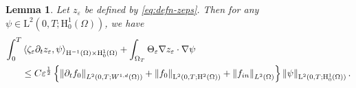 \documentclass[10pt,a4paper]{amsart}
\newtheorem{lemma}{Lemma}
\newcommand{\eps}{\varepsilon}
\begin{document}
\begin{lemma}\label{lem:bound-weak-form-2}
Let $z_\eps$ be defined by \eqref{eq:defn-zeps}. Then for any $\psi \in \mathrm{L}^2(0,T;\mathrm H_0^1(\Omega))$, we have
\begin{equation*}
\begin{aligned}
\int_0^T & \left\langle \zeta_\eps\partial_{t}z_{\varepsilon},\psi \right\rangle_{\mathrm{H}^{-1}(\Omega) \times \mathrm{H}_0^1(\Omega)} 
+ \int_{\Omega_T} \Theta_\eps\nabla z_{\varepsilon} \cdot \nabla \psi
\\
& \le C \eps^{\frac12} \left\{ \left\Vert \partial_tf_0\right\Vert_{L^2(0,T;W^{1,d}(\Omega))} + \left\Vert f_0\right\Vert_{\mathrm L^2(0,T;\mathrm H^2(\Omega))} + \left\Vert f_{{\rm{in}}}\right\Vert_{L^2(\Omega)} \right\} \left\Vert \psi \right\Vert_{\mathrm L^2(0,T;\mathrm H^1_0(\Omega))}.
\end{aligned}
\end{equation*}
\end{lemma} 
\end{document}
